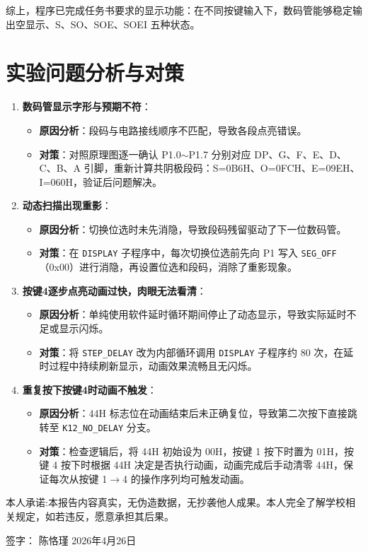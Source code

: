 \documentclass[12pt,a4paper]{article}
\begin{document}
综上，程序已完成任务书要求的显示功能：在不同按键输入下，数码管能够稳定输出空显示、S、SO、SOE、SOEI 五种状态。




\section{实验问题分析与对策}

\begin{enumerate}
    \item \textbf{数码管显示字形与预期不符}：
    \begin{itemize}
        \item \textbf{原因分析}：段码与电路接线顺序不匹配，导致各段点亮错误。
        \item \textbf{对策}：对照原理图逐一确认 P1.0$\sim$P1.7 分别对应 DP、G、F、E、D、C、B、A 引脚，重新计算共阴极段码：S=0B6H、O=0FCH、E=09EH、I=060H，验证后问题解决。
    \end{itemize}
    
    \item \textbf{动态扫描出现重影}：
    \begin{itemize}
        \item \textbf{原因分析}：切换位选时未先消隐，导致段码残留驱动了下一位数码管。
        \item \textbf{对策}：在 \texttt{DISPLAY} 子程序中，每次切换位选前先向 P1 写入 \texttt{SEG\_OFF}（0x00）进行消隐，再设置位选和段码，消除了重影现象。
    \end{itemize}

    \item \textbf{按键4逐步点亮动画过快，肉眼无法看清}：
    \begin{itemize}
        \item \textbf{原因分析}：单纯使用软件延时循环期间停止了动态显示，导致实际延时不足或显示闪烁。
        \item \textbf{对策}：将 \texttt{STEP\_DELAY} 改为内部循环调用 \texttt{DISPLAY} 子程序约 80 次，在延时过程中持续刷新显示，动画效果流畅且无闪烁。
    \end{itemize}

    \item \textbf{重复按下按键4时动画不触发}：
    \begin{itemize}
        \item \textbf{原因分析}：44H 标志位在动画结束后未正确复位，导致第二次按下直接跳转至 \texttt{K12\_NO\_DELAY} 分支。
        \item \textbf{对策}：检查逻辑后，将 44H 初始设为 00H，按键 1 按下时置为 01H，按键 4 按下时根据 44H 决定是否执行动画，动画完成后手动清零 44H，保证每次从按键 1$\rightarrow$4 的操作序列均可触发动画。
    \end{itemize}

\end{enumerate}

\vspace{2cm}
\noindent
本人承诺:本报告内容真实，无伪造数据，无抄袭他人成果。本人完全了解学校相关规定，如若违反，愿意承担其后果。

\vspace{1cm}
\noindent
签字：\hspace{3cm} 陈恪瑾 \hspace{3cm} 2026年4月26日
\end{document}
